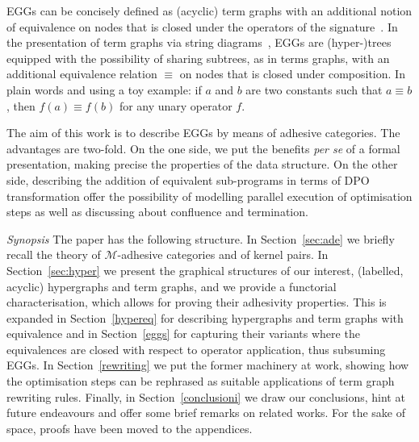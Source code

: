 \documentclass[a4paper,UKenglish,cleveref,pdftex,thm-restate,numberwithinsect]{lipics-v2021}
\begin{document}
EGGs can be concisely defined as (acyclic) term graphs with an additional notion of equivalence on nodes
that is closed under the operators of the signature~\cite[Section~4.2]{DetlefsNS05}.
In the presentation of term graphs via string diagrams~\cite{CastelnovoGM24}, EGGs are (hyper-)trees equipped with 
the possibility of sharing subtrees, as in terms graphs, with an additional equivalence relation $\equiv$ on nodes that 
is closed under composition. In plain words and using a toy example:
if $a$ and $b$ are two constants such that $a \equiv b$, then $f(a) \equiv f(b)$ for any unary operator $f$.



The aim of this work is to describe EGGs by means of adhesive categories. The advantages are two-fold. On the one side, 
we put the benefits \emph{per se} of a formal presentation, making precise the properties of the data structure. 
On the other side, describing the addition of equivalent sub-programs 
in terms of DPO transformation offer the possibility of modelling parallel execution of optimisation steps as well as discussing
about confluence and termination.

\emph{Synopsis}
The paper has the following structure. 
In Section~\ref{sec:ade} we briefly recall 
the theory of $\mathcal{M}$-adhesive categories
and of kernel pairs.
In Section~\ref{sec:hyper} we present the graphical structures of our interest, 
 (labelled, acyclic) hypergraphs and term graphs, and we provide a
functorial characterisation, which allows for proving their adhesivity properties.
This is expanded in Section~\ref{hypereq} for describing hypergraphs 
and term graphs with equivalence and in Section~\ref{eggs} for capturing
their variants where the equivalences are closed with respect to operator application,
thus subsuming EGGs.
%
In Section~\ref{rewriting} we put the former machinery at work, showing how the optimisation steps
can be rephrased as suitable applications of term graph rewriting rules.
%
Finally, in Section~\ref{conclusioni} we draw our conclusions, hint at future endeavours and offer some 
brief remarks on related works.
%
For the sake of space, proofs have been moved to the appendices. 
\end{document}
